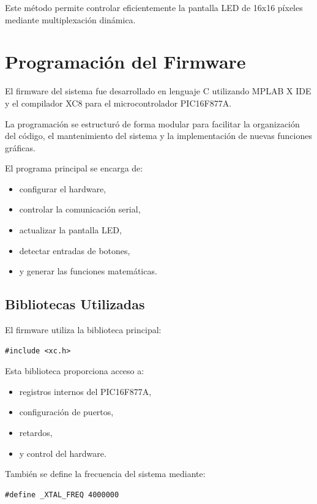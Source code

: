 Este método permite controlar eficientemente la pantalla LED de 16x16 píxeles mediante multiplexación dinámica.

\section{Programación del Firmware}

El firmware del sistema fue desarrollado en lenguaje C utilizando MPLAB X IDE y el compilador XC8 para el microcontrolador PIC16F877A.

La programación se estructuró de forma modular para facilitar la organización del código, el mantenimiento del sistema y la implementación de nuevas funciones gráficas.

El programa principal se encarga de:

\begin{itemize}
    \item configurar el hardware,
    \item controlar la comunicación serial,
    \item actualizar la pantalla LED,
    \item detectar entradas de botones,
    \item y generar las funciones matemáticas.
\end{itemize}

\subsection{Bibliotecas Utilizadas}

El firmware utiliza la biblioteca principal:

\begin{verbatim}
#include <xc.h>
\end{verbatim}

Esta biblioteca proporciona acceso a:

\begin{itemize}
    \item registros internos del PIC16F877A,
    \item configuración de puertos,
    \item retardos,
    \item y control del hardware.
\end{itemize}

También se define la frecuencia del sistema mediante:

\begin{verbatim}
#define _XTAL_FREQ 4000000
\end{verbatim}


